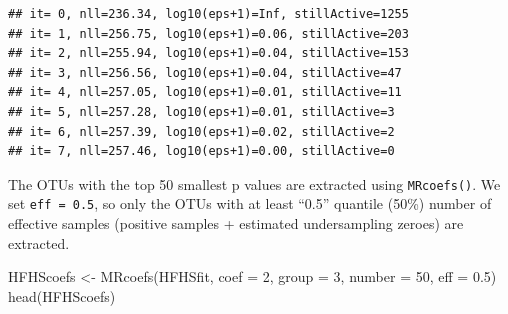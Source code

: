 \documentclass[
]{book}
\newenvironment{Shaded}{\begin{snugshade}}{\end{snugshade}}
\newcommand{\AttributeTok}[1]{\textcolor[rgb]{0.77,0.63,0.00}{#1}}
\newcommand{\CommentTok}[1]{\textcolor[rgb]{0.56,0.35,0.01}{\textit{#1}}}
\newcommand{\ConstantTok}[1]{\textcolor[rgb]{0.00,0.00,0.00}{#1}}
\newcommand{\DecValTok}[1]{\textcolor[rgb]{0.00,0.00,0.81}{#1}}
\newcommand{\FloatTok}[1]{\textcolor[rgb]{0.00,0.00,0.81}{#1}}
\newcommand{\FunctionTok}[1]{\textcolor[rgb]{0.00,0.00,0.00}{#1}}
\newcommand{\NormalTok}[1]{#1}
\newcommand{\OtherTok}[1]{\textcolor[rgb]{0.56,0.35,0.01}{#1}}
\newcommand{\SpecialCharTok}[1]{\textcolor[rgb]{0.00,0.00,0.00}{#1}}
\begin{document}
\begin{Shaded}
\end{Shaded}

\begin{verbatim}
## it= 0, nll=236.34, log10(eps+1)=Inf, stillActive=1255
## it= 1, nll=256.75, log10(eps+1)=0.06, stillActive=203
## it= 2, nll=255.94, log10(eps+1)=0.04, stillActive=153
## it= 3, nll=256.56, log10(eps+1)=0.04, stillActive=47
## it= 4, nll=257.05, log10(eps+1)=0.01, stillActive=11
## it= 5, nll=257.28, log10(eps+1)=0.01, stillActive=3
## it= 6, nll=257.39, log10(eps+1)=0.02, stillActive=2
## it= 7, nll=257.46, log10(eps+1)=0.00, stillActive=0
\end{verbatim}

The OTUs with the top 50 smallest p values are extracted using \texttt{MRcoefs()}. We set \texttt{eff\ =\ 0.5}, so only the OTUs with at least ``0.5'' quantile (50\%) number of effective samples (positive samples + estimated undersampling zeroes) are extracted.

\begin{Shaded}
\begin{Highlighting}[]
\NormalTok{HFHScoefs }\OtherTok{\textless{}{-}} \FunctionTok{MRcoefs}\NormalTok{(HFHSfit, }\AttributeTok{coef =} \DecValTok{2}\NormalTok{, }\AttributeTok{group =} \DecValTok{3}\NormalTok{, }\AttributeTok{number =} \DecValTok{50}\NormalTok{, }\AttributeTok{eff =} \FloatTok{0.5}\NormalTok{)}
\FunctionTok{head}\NormalTok{(HFHScoefs)}
\end{Highlighting}
\end{Shaded}
\end{document}
